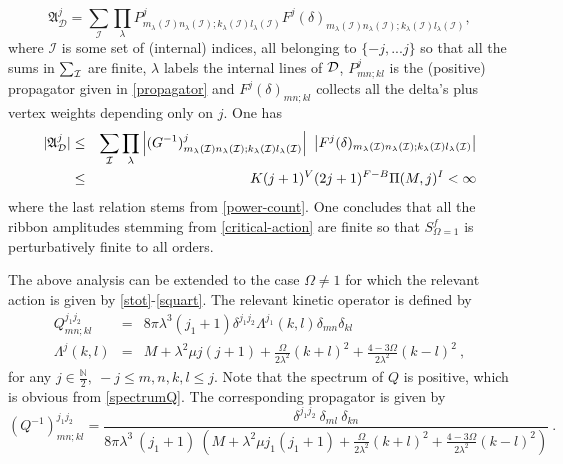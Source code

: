 \documentclass[a4paper,11pt,twoside]{article}
\numberwithin{equation}{section}
\theoremstyle{nonumberplain}
\newcounter{and}
\begin{document}
%
\begin{equation}
\mathfrak{A}^j_{\mathcal{D}} = \sum_{\mathcal{I}} \prod_\lambda P^j_{m_\lambda(\mathcal{I}) n_\lambda(\mathcal{I});k_\lambda(\mathcal{I}) l_\lambda(\mathcal{I})} F^j(\delta)_{m_\lambda(\mathcal{I}) n_\lambda(\mathcal{I});k_\lambda(\mathcal{I}) l_\lambda(\mathcal{I})},\label{amplit-arb}
\end{equation}
%
where $\mathcal{I}$ is some set of (internal) indices, all belonging to $\{-j,...j\}$ so that all the sums in $\sum_{{\cal{I}}}$ are finite, $\lambda$ labels the internal lines of ${\cal{D}}$, $P^j_{mn;kl}$ is the (positive) propagator given in \eqref{propagator} and $F^j(\delta)_{mn;kl}$ collects all the delta's plus vertex weights depending only on $j$. One has%
%
\begin{eqnarray}
\vert\mathfrak{A}^j_{\mathcal{D}}\vert &\le& \sum_{\mathcal{I}} \prod_\lambda \left|(G^{-1})^j_{m_\lambda(\mathcal{I}) n_\lambda(\mathcal{I}) ; k_\lambda(\mathcal{I}) l_\lambda(\mathcal{I})} \right| \ \left| F^j(\delta)_{m_\lambda({\cal{I}}) n_\lambda({\cal{I}});k_\lambda({\cal{I}}) l_\lambda({\cal{I}})} \right|\nonumber \\ 
&\le& K(j+1)^V(2j+1)^{F-B}\Pi(M,j)^I<\infty
\end{eqnarray}
%
where the last relation stems from \eqref{power-count}. One concludes that all the ribbon amplitudes stemming from \eqref{critical-action} are finite so that $S^f_{\Omega=1}$ is perturbatively finite to all orders.\par%
%
The above analysis can be extended to the case $\Omega\ne1$ for which the relevant action is given by \eqref{stot}-\eqref{squart}. The relevant kinetic operator is defined by%
%
\begin{eqnarray}
Q^{j_1j_2}_{mn;kl} &=& 8\pi\lambda^3 (j_1+1) \delta^{j_1j_2} \Lambda^{j_1}(k,l)\delta_{mn}\delta_{kl}\label{propaQ} \\
\Lambda^{j}(k,l)&=& M+\lambda^2\mu j(j+1)+\frac{\Omega}{2\lambda^2}(k+l)^2+\frac{4-3\Omega}{2\lambda^2}(k-l)^2 \ , \label{spectrumQ}
\end{eqnarray}
%
for any $j\in\frac{\mathbb{N}}{2},\ -j\le m,n,k,l\le j$. Note that the spectrum of $Q$ is positive, which is obvious from \eqref{spectrumQ}. The corresponding propagator is given by%
%
\begin{equation}
(Q^{-1})^{j_1j_2}_{mn;kl} = 
\frac{ \delta^{j_1j_2} \ \delta_{ml} \ \delta_{kn}}{8\pi\lambda^3 \ (j_1+1) \ \left(M +\lambda^2\mu j_1(j_1+1) + \frac{\Omega}{2\lambda^2} (k+l)^2 + \frac{4-3\Omega}{2\lambda^2} (k-l)^2 \right) } \ . \label{q-1}
\end{equation}
\end{document}

